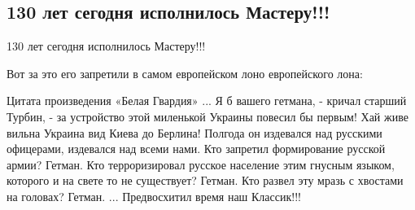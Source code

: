  
 
 
 
 

\subsection{130 лет сегодня исполнилось Мастеру!!!}

130 лет сегодня исполнилось Мастеру!!!

Вот за это его запретили в самом европейском лоно европейского лона:

Цитата произведения «Белая Гвардия»
... Я б вашего гетмана, - кричал старший Турбин, - за устройство этой миленькой Украины повесил бы первым!
Хай живе вильна Украина вид Киева до Берлина! Полгода он издевался над русскими офицерами, издевался над всеми нами.
Кто запретил формирование русской армии? Гетман.
Кто терроризировал русское население этим гнусным языком, которого и на свете то не существует? Гетман.
Кто развел эту мразь с хвостами на головах? Гетман. ...
Предвосхитил время наш Классик!!!
